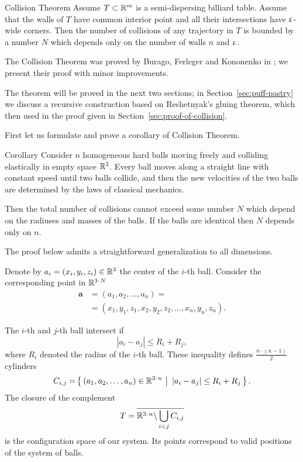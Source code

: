 \begin{thm}{Collision Theorem}\label{thm:collision}
Assume $T\subset\RR^m$
is a semi-dispersing billiard table.
Assume that the walls of $T$ have common interior point 
and all their intersections have $\upvarepsilon$-wide corners.
Then the number of collisions of any trajectory in  $T$  is bounded
by a number $N$ which depends only on the number of walls $n$ and $\upvarepsilon$.
\end{thm}

The Collision Theorem was proved by Burago, Ferleger and Kononenko in \cite{BFK};
we present their proof with minor improvements.

The theorem will be proved in the next two sections;
in Section~\ref{sec:puff-pastry} we discuss a recursive construction based on Reshetnyak's gluing theorem,
which then used in the proof given in Section~\ref{sec:proof-of-collision}.

First let us formulate and prove a corollary of Collision Theorem.

\begin{thm}{Corollary}\label{cor:balls}
Consider $n$ homogeneous hard balls
moving freely and colliding
elastically in empty space $\mathbb{R}^3$. 
Every ball moves
along a straight line with constant speed until two balls collide, and then
the new velocities of the two balls are determined by the
laws of classical mechanics.

Then the total number of collisions cannot exceed some number $N$ which depend on the radiuses and masses of the balls.
If the balls are identical then $N$ depends only on $n$.
\end{thm}

The proof below admits a straightforward generalization to all dimensions.

Denote by $a_i=(x_i,y_i,z_i) \in \RR^3$ the center of the $i$-th ball.
Consider the corresponding point in $\RR^{3\cdot N}$
\begin{align*}
\bm{a}&=(a_1, a_2 , \dots , a_n ) =
\\
&=(x_1, y_1 , z_1 , x_2 , y_2 , z_2 , \dots , x_n , y_n , z_n).
\end{align*}

The $i$-th and $j$-th ball intersect if 
$$|a_i - a_j | \le R_i+R_j,$$
where $R_i$ denoted the radius of the $i$-th ball.
These inequality defines $\tfrac{n\cdot(n-1)}{2}$ cylinders 
\[C_{i,j}=\set{(a_1, a_2 , \dots , a_n )\in\RR^{3\cdot n}} {|a_i - a_j | \le R_i+R_j}.\] 
The closure of the complement
\[T=\overline{\RR^{3\cdot n}\backslash \bigcup_{i< j} C_{i,j}}\] 
is the configuration space of our system. 
Its points correspond
to valid positions of the system of balls.

